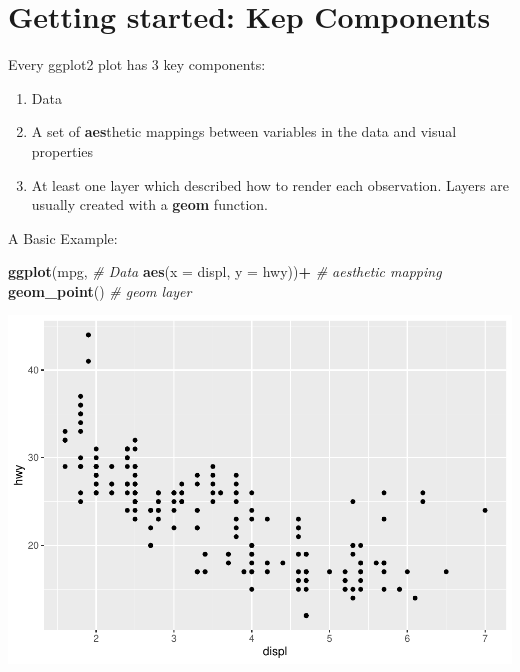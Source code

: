 \documentclass[
]{book}
\newenvironment{Shaded}{\begin{snugshade}}{\end{snugshade}}
\newcommand{\CommentTok}[1]{\textcolor[rgb]{0.56,0.35,0.01}{\textit{#1}}}
\newcommand{\DataTypeTok}[1]{\textcolor[rgb]{0.13,0.29,0.53}{#1}}
\newcommand{\KeywordTok}[1]{\textcolor[rgb]{0.13,0.29,0.53}{\textbf{#1}}}
\newcommand{\NormalTok}[1]{#1}
\newcommand{\OperatorTok}[1]{\textcolor[rgb]{0.81,0.36,0.00}{\textbf{#1}}}
\newcommand{\StringTok}[1]{\textcolor[rgb]{0.31,0.60,0.02}{#1}}
\begin{document}
\hypertarget{getting-started-kep-components}{%
\section{Getting started: Kep Components}\label{getting-started-kep-components}}

Every ggplot2 plot has 3 key components:

\begin{enumerate}
\def\labelenumi{\arabic{enumi})}
\item
  Data
\item
  A set of \textbf{aes}thetic mappings between variables in the data and visual properties
\item
  At least one layer which described how to render each observation. Layers are usually created with a \textbf{geom} function.
\end{enumerate}

A Basic Example:

\begin{Shaded}
\begin{Highlighting}[]
\KeywordTok{ggplot}\NormalTok{(mpg,                        }\CommentTok{# Data}
       \KeywordTok{aes}\NormalTok{(}\DataTypeTok{x =}\NormalTok{ displ, }\DataTypeTok{y =}\NormalTok{ hwy))}\OperatorTok{+}\StringTok{   }\CommentTok{# aesthetic mapping}
\StringTok{  }\KeywordTok{geom_point}\NormalTok{()                     }\CommentTok{# geom layer }
\end{Highlighting}
\end{Shaded}

\includegraphics{_main_files/figure-latex/unnamed-chunk-314-1.pdf}
\end{document}
